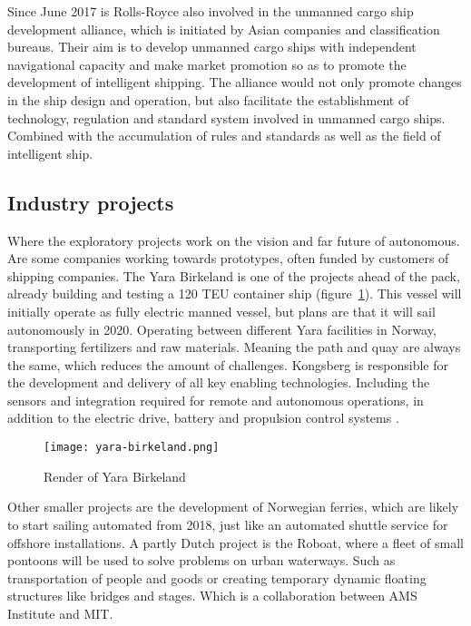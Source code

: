 Since June 2017 is Rolls-Royce also involved in the unmanned cargo ship development alliance, which is initiated by Asian companies and classification bureaus. Their aim is to develop unmanned cargo ships with independent navigational capacity and make market promotion so as to promote the development of intelligent shipping.
The alliance would not only promote changes in the ship design and operation, but also facilitate the establishment of technology, regulation and standard system involved in unmanned cargo ships. Combined with the accumulation of rules and standards as well as the field of intelligent ship.

\subsection{Industry projects}
Where the exploratory projects work on the vision and far future of autonomous. Are some companies working towards prototypes, often funded by customers of shipping companies.
The Yara Birkeland is one of the projects ahead of the pack, already building and testing a 120 \ac{TEU} container ship (figure~\ref{fig:yara-birkeland}). This vessel will initially operate as fully electric manned vessel, but plans are that it will sail autonomously in 2020. Operating between different Yara facilities in Norway, transporting fertilizers and raw materials. Meaning the path and quay are always the same, which reduces the amount of challenges.
Kongsberg is responsible for the development and delivery of all key enabling technologies. Including the sensors and integration required for remote and autonomous operations, in addition to the electric drive, battery and propulsion control systems \cite{Sames2017}.

\begin{figure}[p]
	\centering
	\texttt{[image: yara-birkeland.png]}
	\caption{Render of Yara Birkeland}
	\label{fig:yara-birkeland}
\end{figure}

Other smaller projects are the development of Norwegian ferries, which are likely to start sailing automated from 2018, just like an automated shuttle service for offshore installations. A partly Dutch project is the Roboat, where a fleet of small pontoons will be used to solve problems on urban waterways. Such as transportation of people and goods or creating temporary dynamic floating structures like bridges and stages. Which is a collaboration between AMS Institute and MIT.

